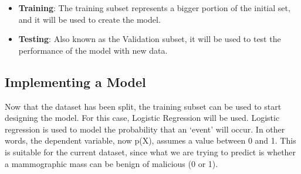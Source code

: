 \documentclass[a4paper,12pt]{article}\usepackage[]{graphicx}\usepackage[]{color}
\begin{document}
\begin{itemize}
\item \textbf{Training}: The training subset represents a bigger portion of the initial set, and it will be used to create the model.
\item \textbf{Testing}: Also known as the Validation subset, it will be used to test the performance of the model with new data.
\end{itemize}

\subsection{Implementing a Model}\label{model}
Now that the dataset has been split, the training subset can be used to start designing the model. For this case, Logistic Regression will be used. Logistic regression is used to model the probability that an ‘event’ will occur. In other words, the dependent variable, now p(X), assumes a value between 0 and 1. This is suitable for the current dataset, since what we are trying to predict is whether a mammographic mass can be benign of malicious (0 or 1).
\end{document}
